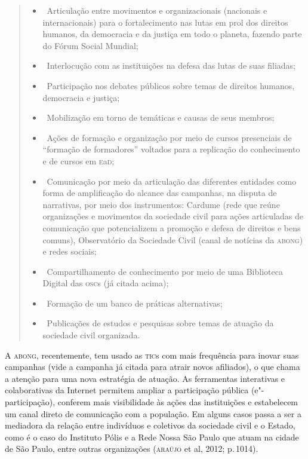 \begin{quote}
\begin{itemize}
\item\, Articulação entre movimentos e organizacionais (nacionais e internacionais) para o fortalecimento nas lutas em prol dos direitos humanos, da democracia e da justiça em todo o planeta, fazendo parte do Fórum Social Mundial;
\item\, Interlocução com as instituições na defesa das lutas de suas filiadas;
\item\, Participação nos debates públicos sobre temas de direitos humanos, democracia e justiça;
\item\, Mobilização em torno de temáticas e causas de seus membros;
\item\, Ações de formação e organização por meio de cursos presenciais de ``formação de formadores'' voltados para a replicação do conhecimento e de cursos em \textsc{e}a\textsc{d};
\item\, Comunicação por meio da articulação das diferentes entidades como forma de amplificação do alcance das campanhas, na disputa de narrativas, por meio dos instrumentos: Cardume (rede que reúne organizações e movimentos da sociedade civil para ações articuladas de comunicação que potencializem a promoção e defesa de direitos e bens comuns), Observatório da Sociedade Civil (canal de notícias da \textsc{abong}) e redes sociais; %
\item\, Compartilhamento de conhecimento por meio de uma Biblioteca Digital das \textsc{osc}s (já citada acima);
\item\, Formação de um banco de práticas alternativas;
\item\, Publicações de estudos e pesquisas sobre temas de atuação da sociedade civil organizada.
\end{itemize}
\end{quote}

A \textsc{abong}, recentemente, tem usado as \textsc{tic}s com mais frequência para inovar
suas campanhas (vide a campanha já citada para atrair novos afiliados),
o que chama a atenção para uma nova estratégia de atuação. As
ferramentas interativas e colaborativas da Internet permitem ampliar a
participação pública (e"-participação), conferem mais visibilidade às
ações das instituições e estabelecem um canal direto de comunicação com
a população. Em alguns casos passa a ser a mediadora da relação entre
indivíduos e coletivos da sociedade civil e o Estado, como é o caso do
Instituto Pólis e a Rede Nossa São Paulo que atuam na cidade de São
Paulo, entre outras organizações (\textsc{araújo} et al, 2012; p.\,1014).

